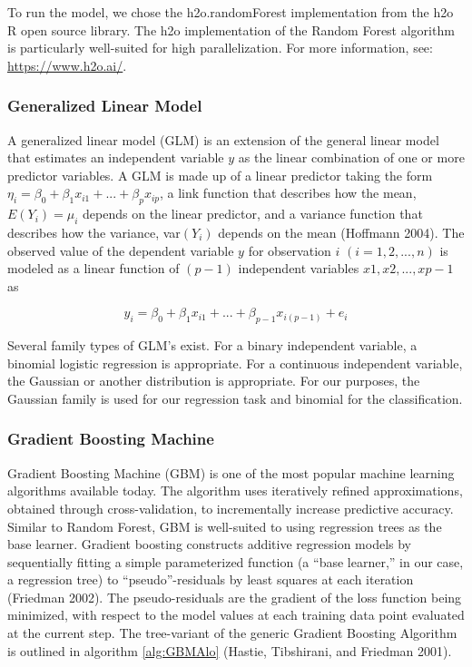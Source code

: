 \documentclass[12pt,]{article}
\begin{document}
To run the model, we chose the h2o.randomForest implementation from the
h2o R open source library. The h2o implementation of the Random Forest
algorithm is particularly well-suited for high parallelization. For more
information, see: \url{https://www.h2o.ai/}.

\hypertarget{generalized-linear-model}{%
\subsubsection{Generalized Linear
Model}\label{generalized-linear-model}}

A generalized linear model (GLM) is an extension of the general linear
model that estimates an independent variable \(y\) as the linear
combination of one or more predictor variables. A GLM is made up of a
linear predictor taking the form
\(\eta_i = \beta_0+\beta_1x_{i1}+...+\beta_{p}x_{ip}\), a link function
that describes how the mean, \(E(Y_i)=\mu_i\) depends on the linear
predictor, and a variance function that describes how the variance,
var\((Y_i)\) depends on the mean (Hoffmann 2004). The observed value of
the dependent variable \(y\) for observation \(i\)
\((i = 1, 2, ..., n)\) is modeled as a linear function of \((p - 1)\)
independent variables \(x1, x2,... ,xp-1\) as

\[
y_i = \beta_0+\beta_1x_{i1}+...+\beta_{p-1}x_{i(p-1)}+e_i
\]

Several family types of GLM's exist. For a binary independent variable,
a binomial logistic regression is appropriate. For a continuous
independent variable, the Gaussian or another distribution is
appropriate. For our purposes, the Gaussian family is used for our
regression task and binomial for the classification.

\hypertarget{gradient-boosting-machine}{%
\subsubsection{Gradient Boosting
Machine}\label{gradient-boosting-machine}}

Gradient Boosting Machine (GBM) is one of the most popular machine
learning algorithms available today. The algorithm uses iteratively
refined approximations, obtained through cross-validation, to
incrementally increase predictive accuracy. Similar to Random Forest,
GBM is well-suited to using regression trees as the base learner.
Gradient boosting constructs additive regression models by sequentially
fitting a simple parameterized function (a ``base learner,'' in our
case, a regression tree) to ``pseudo''-residuals by least squares at
each iteration (Friedman 2002). The pseudo-residuals are the gradient of
the loss function being minimized, with respect to the model values at
each training data point evaluated at the current step. The tree-variant
of the generic Gradient Boosting Algorithm is outlined in algorithm
\ref{alg:GBMAlo} (Hastie, Tibshirani, and Friedman 2001).
\end{document}
